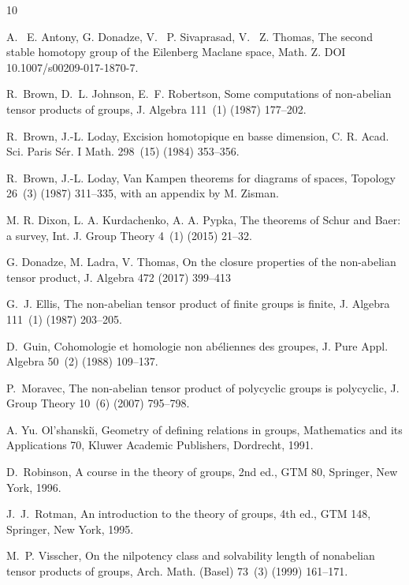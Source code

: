 \documentclass[12pt,reqno]{amsart}
\theoremstyle{definition}
\numberwithin{equation}{section}
\theoremstyle{definition}
\begin{document}
\begin{thebibliography}{10}

A. ~E. Antony, G. Donadze, V. ~P. Sivaprasad, V. ~Z. Thomas, The second stable homotopy group of the
Eilenberg Maclane space, Math. Z.
DOI 10.1007/s00209-017-1870-7.

R.~Brown, D.~L. Johnson, E.~F. Robertson, Some computations of non-abelian
  tensor products of groups, J. Algebra 111~(1) (1987) 177--202.

R.~Brown, J.-L. Loday, Excision homotopique en basse dimension, C. R. Acad.
  Sci. Paris S\'er. I Math. 298~(15) (1984) 353--356.

R.~Brown, J.-L. Loday, Van {K}ampen theorems for diagrams of spaces, Topology
  26~(3) (1987) 311--335, with an appendix by M. Zisman.

M. R. Dixon,  L. A. Kurdachenko, A. A. Pypka, The theorems of Schur and Baer: a survey,
Int. J. Group Theory  4~(1)  (2015) 21--32.

G. Donadze, M. Ladra, V. Thomas, On the closure properties of the non-abelian tensor product, J. Algebra 472 (2017) 399--413

G.~J. Ellis, The non-abelian tensor product of finite groups is finite, J.
  Algebra 111~(1) (1987) 203--205.

D.~Guin, Cohomologie et homologie non ab\'eliennes des groupes, J. Pure Appl.
  Algebra 50~(2) (1988) 109--137.

P.~Moravec, The non-abelian tensor product of polycyclic groups is polycyclic,
  J. Group Theory 10~(6) (2007) 795--798.

A. Yu. Ol'shanski\u\i, Geometry of defining relations in groups, Mathematics and its Applications 70, Kluwer Academic Publishers, Dordrecht, 1991.

D.~Robinson, A course in the theory of groups, 2nd ed., GTM 80, Springer,  New York, 1996.

J.~J.~Rotman, An introduction to the theory of groups, 4th ed., GTM 148, Springer, New York, 1995.

M.~P. Visscher, On the nilpotency class and solvability length of nonabelian tensor products of groups, Arch. Math. (Basel) 73~(3) (1999) 161--171.


\end{thebibliography}
\end{document}
